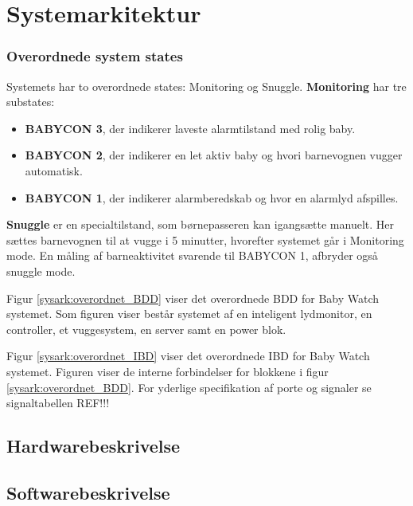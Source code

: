 \chapter{Systemarkitektur}



\subsection{Overordnede system states}

Systemets har to overordnede states: Monitoring og Snuggle. \textbf{Monitoring} har tre substates: 
\begin{itemize}
\item \textbf{BABYCON 3}, der indikerer laveste alarmtilstand med rolig baby. \item \textbf{BABYCON 2}, der indikerer en let aktiv baby og hvori barnevognen vugger automatisk.
\item \textbf{BABYCON 1}, der indikerer alarmberedskab og hvor en alarmlyd afspilles. 
\end{itemize}

\textbf{Snuggle} er en specialtilstand, som børnepasseren kan igangsætte manuelt. Her sættes barnevognen til at vugge i 5 minutter, hvorefter systemet går i Monitoring mode. En måling af barneaktivitet svarende til BABYCON 1, afbryder også snuggle mode.


Figur \ref{sysark:overordnet_BDD} viser det overordnede BDD for Baby Watch systemet. Som figuren viser består systemet af en inteligent lydmonitor, en controller, et vuggesystem, en server samt en power blok. 


Figur \ref{sysark:overordnet_IBD} viser det overordnede IBD for Baby Watch systemet.  Figuren viser de interne forbindelser for blokkene i figur \ref{sysark:overordnet_BDD}. For yderlige specifikation af porte og signaler se signaltabellen REF!!!

\newpage
\section{Hardwarebeskrivelse}


\clearpage
\section{Softwarebeskrivelse}



